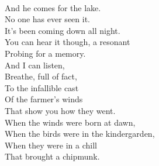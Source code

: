 \documentclass[smalldemyvopaper,11pt,twoside,onecolumn,openright,extrafontsizes]{memoir}
\begin{document}
\\And he comes for the lake.
\\No one has ever seen it.
\\It's been coming down all night.
\\You can hear it though, a resonant
\\Probing for a memory.
\\And I can listen,
\\Breathe, full of fact,
\\To the infallible cast
\\Of the farmer's winds
\\That show you how they went.
\\When the winds were born at dawn,
\\When the birds were in the kindergarden,
\\When they were in a chill
\\That brought a chipmunk.
\end{document}
